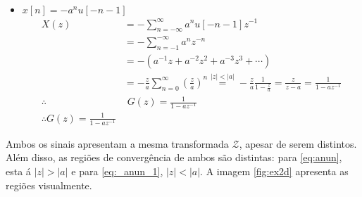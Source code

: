 \begin{enumerate}
\begin{itemize}
                \item $x[n] = -a^n u[-n-1]$
                    \begin{equation}
                        \begin{split}
                            X(z) &= - \sum_{n = - \infty}^{\infty} a^n u[-n - 1] z^{-1} \\
                            &= - \sum_{n = -1}^{-\infty} a^n z^{-n} \\
                            &= -\left(a^{-1}z + a^{-2} z^2 + a^{-3} z^3 + \cdots\right) \\
                            &= -\frac{z}{a} \sum_{n = 0}^{\infty} (\frac{z}{a})^n \stackrel{|z| < |a|}{=} - \frac{z}{a} \frac{1}{1 - \frac{z}{a}} = \frac{z}{z-a} = \frac{1}{1 - a z^{-1}} \\
                            \therefore & \,\, G(z) = \frac{1}{1 - a z^{-1}} \\
                            \therefore G(z) = \frac{1}{1 - a z^{-1}}
                        \end{split}
                    \label{eq:_anun_1}
                    \end{equation}
            \end{itemize}
        \end{enumerate}
    
    Ambos os sinais apresentam a mesma transformada $\mathcal{Z}$, apesar de serem distintos. Além disso, as regiões de convergência de ambos são distintas: para \eqref{eq:anun}, esta á  $|z| > |a|$ e para \eqref{eq:_anun_1}, $|z| < |a|$. A imagem \ref{fig:ex2d} apresenta as regiões visualmente.
    
